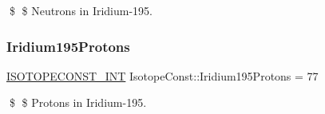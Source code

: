 \$ \$ Neutrons in Iridium-\/195. \mbox{\label{group___isotope_const-_iridium-_ir195_ga838b223a468798b5a7a4251ca7cdd99e}} 
\subsubsection{\texorpdfstring{Iridium195\+Protons}{Iridium195Protons}}
{\footnotesize\ttfamily \mbox{\hyperlink{group___isotope_const-_macros_ga5f18360b3e99483a35c32d789e62621c}{I\+S\+O\+T\+O\+P\+E\+C\+O\+N\+S\+T\+\_\+\+I\+NT}} Isotope\+Const\+::\+Iridium195\+Protons = 77}

\$ \$ Protons in Iridium-\/195. 